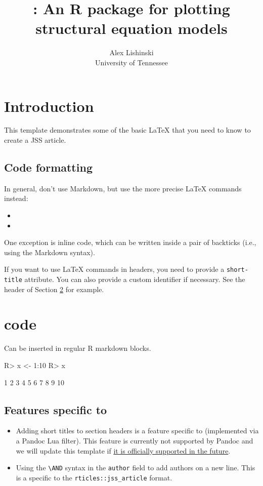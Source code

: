 \documentclass[
]{jss}
\author{
Alex Lishinski\\University of Tennessee
}
\title{\pkg{lavaanPlot}: An R package for plotting structural equation models}
\providecommand{\tightlist}{%
  \setlength{\itemsep}{0pt}\setlength{\parskip}{0pt}}
\begin{document}
\hypertarget{introduction}{%
\section{Introduction}\label{introduction}}

This template demonstrates some of the basic LaTeX that you need to know
to create a JSS article.

\hypertarget{code-formatting}{%
\subsection{Code formatting}\label{code-formatting}}

In general, don't use Markdown, but use the more precise LaTeX commands
instead:

\begin{itemize}
\item
\item
\end{itemize}

One exception is inline code, which can be written inside a pair of
backticks (i.e., using the Markdown syntax).

If you want to use LaTeX commands in headers, you need to provide a
\texttt{short-title} attribute. You can also provide a custom identifier
if necessary. See the header of Section \ref{r-code} for example.

\section[R code]{ code}\label{r-code}

Can be inserted in regular R markdown blocks.

\begin{CodeChunk}
\begin{CodeInput}
R> x <- 1:10
R> x
\end{CodeInput}
\begin{CodeOutput}
 [1]  1  2  3  4  5  6  7  8  9 10
\end{CodeOutput}
\end{CodeChunk}

\subsection[Features specific to rticles]{Features specific to
}\label{features-specific-to}

\begin{itemize}
\tightlist
\item
  Adding short titles to section headers is a feature specific to
   (implemented via a Pandoc Lua filter). This feature is
  currently not supported by Pandoc and we will update this template if
  \href{https://github.com/jgm/pandoc/issues/4409}{it is officially
  supported in the future}.
\item
  Using the \texttt{\textbackslash{}AND} syntax in the \texttt{author}
  field to add authors on a new line. This is a specific to the
  \texttt{rticles::jss\_article} format.
\end{itemize}
\end{document}
